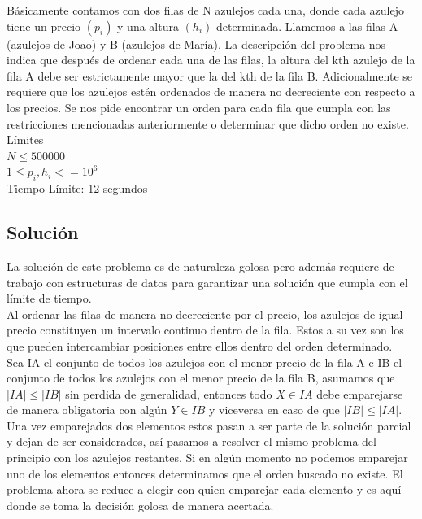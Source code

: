 \documentclass{report}
\begin{document}
B\'asicamente contamos con dos filas de N azulejos cada una, donde cada azulejo tiene un precio $(p_i)$ y una altura $(h_i)$ determinada. Llamemos a las filas A (azulejos de Joao) y B (azulejos de Mar\'ia). La descripci\'on del problema nos indica que despu\'es de ordenar cada una de las filas, la altura del kth azulejo de la fila A debe ser estrictamente mayor que la del kth de la fila B. Adicionalmente se requiere que los azulejos est\'en ordenados de manera no decreciente con respecto a los precios. Se nos pide encontrar un orden para cada fila que cumpla con las restricciones mencionadas anteriormente o determinar que dicho orden no existe.\\

L\'imites\\
$N \leq 500000$\\
$1 \leq p_i, h_i <=10^6$\\
Tiempo L\'imite: 12 segundos\\

\subsection{Soluci\'on}
La soluci\'on de este problema es de naturaleza golosa pero adem\'as requiere de trabajo con estructuras de datos para garantizar una soluci\'on que cumpla con el l\'imite de tiempo.\\

Al ordenar las filas de manera no decreciente por el precio, los azulejos de igual precio constituyen un intervalo continuo dentro de la fila. Estos a su vez son los que pueden intercambiar posiciones entre ellos dentro del orden determinado.\\ 
Sea IA el conjunto de todos los azulejos con el menor precio de la fila A e IB el conjunto de todos los azulejos con el menor precio de la fila B,
asumamos que $|IA|\leq|IB|$ sin perdida de generalidad, entonces todo $X \in IA$ debe emparejarse de manera obligatoria con alg\'un $Y\in IB$ y viceversa en caso de que $|IB|\leq|IA|$. Una vez emparejados dos elementos estos pasan a ser parte de la soluci\'on parcial y dejan de ser considerados, as\'i pasamos a resolver el mismo problema del principio con los azulejos restantes. Si en alg\'un momento no podemos emparejar uno de los elementos entonces determinamos que el orden buscado no existe. El problema ahora se reduce a elegir con quien emparejar cada elemento y es aqu\'i donde se toma la decisi\'on golosa de manera acertada.
\end{document}
